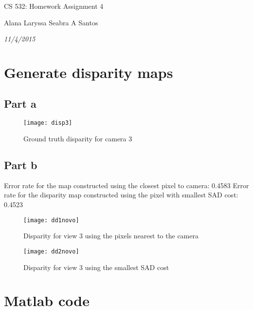 \documentclass{article}
\begin{document}
\centerline{\sc \large CS 532: Homework Assignment 4}
\vspace{.5pc}
\centerline{Alana Laryssa Seabra A Santos}
\centerline{\it 11/4/2015}
\vspace{1pc}

\section{Generate disparity maps}

\subsection{Part a}

\begin{figure}[h!]
  \caption{Ground truth disparity for camera 3}
  \centering
    \texttt{[image: disp3]}
\end{figure}

\subsection{Part b}

Error rate for the map constructed using the closest pixel to camera: 0.4583 \newline
Error rate for the disparity map constructed using the pixel with smallest SAD cost: 0.4523

\begin{figure}[H]
  \caption{Disparity for view 3 using the pixels nearest to the camera}
  \centering
    \texttt{[image: dd1novo]}
\end{figure}

\begin{figure}[H]
  \caption{Disparity for view 3 using the smallest SAD cost}
  \centering
    \texttt{[image: dd2novo]}
\end{figure}

\section{Matlab code}
\end{document}

